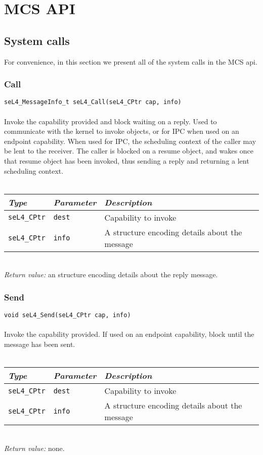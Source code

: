 
\chapter{MCS API}
\label{appendix:api}

\newcommand{\apidoc}[6]
{
    \subsection{\label{api:#1}#2}
    \texttt{#4}\\
    \vspace{3pt}\\
    \noindent
    #3\\
    \vspace{3pt}\\
    \begin{tabularx}{\textwidth}{llX}\toprule
        \emph{Type} & \emph{Parameter} & \emph{Description} \\\midrule
         #5
        \bottomrule
    \end{tabularx}
    \vspace{3pt}\\
    \noindent
    \textit{Return value:} #6 
}

\newcommand{\param}[3]
{
\texttt{#1} & \texttt{#2} & #3 \\
}
\section{System calls}

For convenience, in this section we present all of the system calls in the MCS api.

\apidoc{call}
{Call}
{Invoke the capability provided and block waiting on a reply. Used to communicate with the kernel 
 to invoke objects, or for \gls{IPC} when used on an endpoint capability. When used for \gls{IPC}, 
  the scheduling context of the caller may be lent to the receiver. The caller is blocked on a
  resume object, and wakes once that resume object has been invoked, thus sending a reply and
  returning a lent scheduling context.}
  {seL4\_MessageInfo\_t seL4\_Call(seL4\_CPtr cap, \code{seL4\_MessageInfo\_t} info)}
{
    \param{seL4\_CPtr}{dest}{Capability to invoke}
    \param{seL4\_CPtr}{info}{A \code{seL4\_MessageInfo\_t} structure encoding details about the message}
}
{an  structure encoding details about the reply message.}

\apidoc{send}
{Send}
{Invoke the capability provided. If used on an endpoint capability, block until the message has been
sent.}
{void seL4\_Send(seL4\_CPtr cap, \code{seL4\_MessageInfo\_t} info)}
{
    \param{seL4\_CPtr}{dest}{Capability to invoke}
    \param{seL4\_CPtr}{info}{A \code{seL4\_MessageInfo\_t} structure encoding details about the message}
}
{none.}

